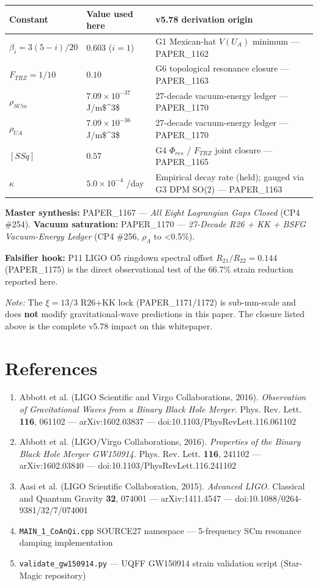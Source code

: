 \documentclass[11pt]{article}
\begin{document}
\begin{center}
\begin{longtable}{lll}
\toprule
Constant & Value used here & v5.78 derivation origin \tabularnewline
\midrule
\endhead
$\beta_i = 3(5-i)/20$ & $0.603$ ($i=1$) & G1 Mexican-hat $V(U_A)$ minimum --- PAPER\_1162 \tabularnewline
$F_{TRZ} = 1/10$ & $0.10$ & G6 topological resonance closure --- PAPER\_1163 \tabularnewline
$\rho_{SCm}$ & $7.09\times10^{-37}$ J/m\$\textasciicircum{}3\$ & 27-decade vacuum-energy ledger --- PAPER\_1170 \tabularnewline
$\rho_{UA}$ & $7.09\times10^{-36}$ J/m\$\textasciicircum{}3\$ & 27-decade vacuum-energy ledger --- PAPER\_1170 \tabularnewline
$[SSq]$ & $0.57$ & G4 $\Phi_{res}$ / $F_{TRZ}$ joint closure --- PAPER\_1165 \tabularnewline
$\kappa$ & $5.0\times10^{-4}$ /day & Empirical decay rate (held); gauged via G3 DPM SO(2) --- PAPER\_1163 \tabularnewline
\bottomrule
\end{longtable}
\end{center}

\textbf{Master synthesis:} PAPER\_1167 --- \emph{All Eight Lagrangian Gaps Closed} (CP4 \#254). \textbf{Vacuum saturation:} PAPER\_1170 --- \emph{27-Decade R26 + KK + BSFG Vacuum-Energy Ledger} (CP4 \#256, $\rho_\Lambda$ to <0.5\%).

\textbf{Falsifier hook:} P11 LIGO O5 ringdown spectral offset $R_{21}/R_{22}=0.144$ (PAPER\_1175) is the direct observational test of the 66.7\% strain reduction reported here.

\emph{Note:} The $\xi=13/3$ R26+KK lock (PAPER\_1171/1172) is sub-mm-scale and does \textbf{not} modify gravitational-wave predictions in this paper. The closure listed above is the complete v5.78 impact on this whitepaper.

\section*{References}

\begin{enumerate}
  \item Abbott et al. (LIGO Scientific and Virgo Collaborations, 2016). \emph{Observation of Gravitational Waves from a Binary Black Hole Merger.} Phys. Rev. Lett. \textbf{116}, 061102 --- arXiv:1602.03837 --- doi:10.1103/PhysRevLett.116.061102
  \item Abbott et al. (LIGO/Virgo Collaborations, 2016). \emph{Properties of the Binary Black Hole Merger GW150914.} Phys. Rev. Lett. \textbf{116}, 241102 --- arXiv:1602.03840 --- doi:10.1103/PhysRevLett.116.241102
  \item Aasi et al. (LIGO Scientific Collaboration, 2015). \emph{Advanced LIGO.} Classical and Quantum Gravity \textbf{32}, 074001 --- arXiv:1411.4547 --- doi:10.1088/0264-9381/32/7/074001
  \item \verb|MAIN_1_CoAnQi.cpp| SOURCE27 namespace --- 5-frequency SCm resonance damping implementation
  \item \verb|validate_gw150914.py| --- UQFF GW150914 strain validation script (Star-Magic repository)
\end{enumerate}


\end{document}
